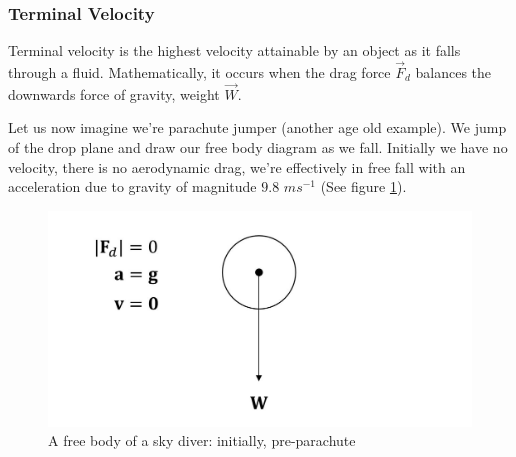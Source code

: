 \subsubsection{Terminal Velocity}

Terminal velocity is the highest velocity attainable by an object as it falls through a fluid. Mathematically, it occurs when the drag force $\vec{F}_d$ balances the downwards force of gravity, weight $\vec{W}$. 



Let us now imagine we're parachute jumper (another age old example). We jump of the drop plane and draw our free body diagram as we fall. Initially we have no velocity, there is no aerodynamic drag, we're effectively in free fall with an acceleration due to gravity of magnitude $9.8$ $ms^{-1}$ (See figure \ref{fig:terminal-velocity-1}). 

\begin{figure}[h!]
    \centering
    \includegraphics[scale=0.3]{notes/images/Terminal-Velocity-1.JPG}
    \caption{A free body of a sky diver: initially, pre-parachute }
    \label{fig:terminal-velocity-1}
\end{figure}
\FloatBarrier

